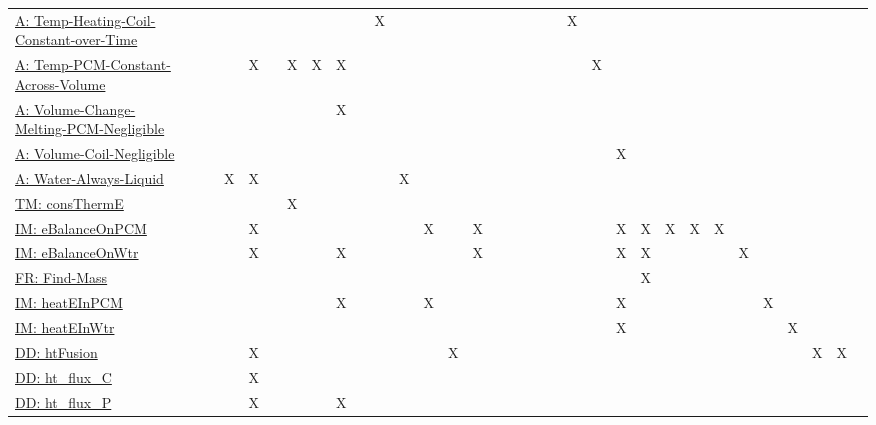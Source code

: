 \documentclass[12pt]{article}
\begin{document}
\begin{longtable}{l l l l l l l l l l l l l l l l l l l l l l l l l l l l l l l l l}
\hyperref[assumpTHCCoT]{A: Temp-Heating-Coil-Constant-over-Time} &  &  &  &  &  &  &  &  &  & X &  &  &  &  &  &  &  &  &  & X &  &  &  &  &  &  &  &  &  &  &  & 
\\
\hyperref[assumpTPCAV]{A: Temp-PCM-Constant-Across-Volume} &  &  &  & X &  & X & X & X &  &  &  &  &  &  &  &  &  &  &  &  & X &  &  &  &  &  &  &  &  &  &  & 
\\
\hyperref[assumpVCMPN]{A: Volume-Change-Melting-PCM-Negligible} &  &  &  &  &  &  &  & X &  &  &  &  &  &  &  &  &  &  &  &  &  &  &  &  &  &  &  &  &  &  &  & 
\\
\hyperref[assumpVCN]{A: Volume-Coil-Negligible} &  &  &  &  &  &  &  &  &  &  &  &  &  &  &  &  &  &  &  &  &  & X &  &  &  &  &  &  &  &  &  & 
\\
\hyperref[assumpWAL]{A: Water-Always-Liquid} &  &  & X & X &  &  &  &  &  &  & X &  &  &  &  &  &  &  &  &  &  &  &  &  &  &  &  &  &  &  &  & 
\\
\hyperref[TM:consThermE]{TM: consThermE} &  &  &  &  &  & X &  &  &  &  &  &  &  &  &  &  &  &  &  &  &  &  &  &  &  &  &  &  &  &  &  & 
\\
\hyperref[IM:eBalanceOnPCM]{IM: eBalanceOnPCM} &  &  &  & X &  &  &  &  &  &  &  & X &  & X &  &  &  &  &  &  &  & X & X & X & X & X &  &  &  &  &  & 
\\
\hyperref[IM:eBalanceOnWtr]{IM: eBalanceOnWtr} &  &  &  & X &  &  &  & X &  &  &  &  &  & X &  &  &  &  &  &  &  & X & X &  &  &  & X &  &  &  &  & 
\\
\hyperref[findMass]{FR: Find-Mass} &  &  &  &  &  &  &  &  &  &  &  &  &  &  &  &  &  &  &  &  &  &  & X &  &  &  &  &  &  &  &  & 
\\
\hyperref[IM:heatEInPCM]{IM: heatEInPCM} &  &  &  &  &  &  &  & X &  &  &  & X &  &  &  &  &  &  &  &  &  & X &  &  &  &  &  & X &  &  &  & 
\\
\hyperref[IM:heatEInWtr]{IM: heatEInWtr} &  &  &  &  &  &  &  &  &  &  &  &  &  &  &  &  &  &  &  &  &  & X &  &  &  &  &  &  & X &  &  & 
\\
\hyperref[DD:htFusion]{DD: htFusion} &  &  &  & X &  &  &  &  &  &  &  &  & X &  &  &  &  &  &  &  &  &  &  &  &  &  &  &  &  & X & X & 
\\
\hyperref[DD:ht.flux.C]{DD: ht\_flux\_C} &  &  &  & X &  &  &  &  &  &  &  &  &  &  &  &  &  &  &  &  &  &  &  &  &  &  &  &  &  &  &  & 
\\
\hyperref[DD:ht.flux.P]{DD: ht\_flux\_P} &  &  &  & X &  &  &  & X &  &  &  &  &  &  &  &  &  &  &  &  &  &  &  &  &  &  &  &  &  &  &  & 
\\

\end{longtable}
\end{document}
